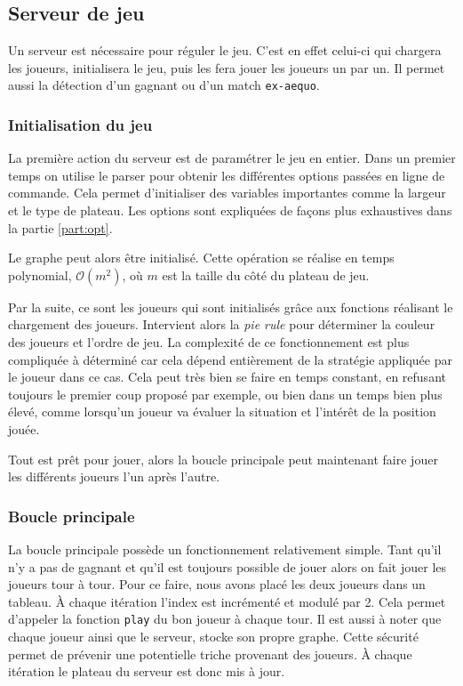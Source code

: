 \documentclass[a4paper, 12pt]{article}
\begin{document}
\subsection{Serveur de jeu}
Un serveur est nécessaire pour réguler le jeu. C'est en effet celui-ci qui chargera les joueurs, initialisera le jeu, puis les fera jouer les joueurs un par un. Il permet aussi la détection d'un gagnant ou d'un match \texttt{ex-aequo}.

\subsubsection{Initialisation du jeu}
La première action du serveur est de paramétrer le jeu en entier. Dans un premier temps on utilise le parser pour obtenir les différentes options passées en ligne de commande. Cela permet d'initialiser des variables importantes comme la largeur et le type de plateau. Les options sont expliquées de façons plus exhaustives dans la partie \ref{part:opt}.

Le graphe peut alors être initialisé. Cette opération se réalise en temps polynomial, $\mathcal{O}(m^2)$, où $m$ est la taille du côté du plateau de jeu.

Par la suite, ce sont les joueurs qui sont initialisés grâce aux fonctions réalisant le chargement des joueurs. Intervient alors la \emph{pie rule} pour déterminer la couleur des joueurs et l'ordre de jeu. La complexité de ce fonctionnement est plus compliquée à déterminé car cela dépend entièrement de la stratégie appliquée par le joueur dans ce cas. Cela peut très bien se faire en temps constant, en refusant toujours le premier coup proposé par exemple, ou bien dans un temps bien plus élevé, comme lorsqu'un joueur va évaluer la situation et l'intérêt de la position jouée.

Tout est prêt pour jouer, alors la boucle principale peut maintenant faire jouer les différents joueurs l'un après l'autre.

\subsubsection{Boucle principale}
La boucle principale possède un fonctionnement relativement simple. Tant qu'il n'y a pas de gagnant et qu'il est toujours possible de jouer alors on fait jouer les joueurs tour à tour. Pour ce faire, nous avons placé les deux joueurs dans un tableau. \`A chaque itération l'index est incrémenté et modulé par 2. Cela permet d'appeler la fonction \texttt{play} du bon joueur à chaque tour. Il est aussi à noter que chaque joueur ainsi que le serveur, stocke son propre graphe. Cette sécurité permet de prévenir une potentielle triche provenant des joueurs. \`A chaque itération le plateau du serveur est donc mis à jour.
\end{document}

